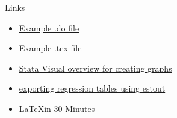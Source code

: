 \documentclass{beamer}
\begin{document}
\begin{frame}{Links}

\begin{itemize}

\item \href{https://github.com/mhdsh1/are256b-w24/blob/main/example.do}
{Example .do file} 
\item \href{https://github.com/mhdsh1/are256b-w24/blob/main/example.tex}
{Example .tex file}
\item \href{https://www.stata.com/support/faqs/graphics/gph/stata-graphs/}
{Stata Visual overview for creating graphs}
\item \href{https://repec.sowi.unibe.ch/stata/estout/index.html}
{exporting regression tables using estout}
\item \href{https://www.overleaf.com/learn/latex/Learn_LaTeX_in_30_minutes}
{\LaTeX in 30 Minutes}

\end{itemize}

\end{frame}
\end{document}
